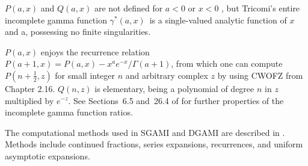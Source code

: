 \documentclass[twoside]{MATH77}
\begin{document}
%
$P(a,x)$ and $Q(a,x)$ are not defined for $a < 0$ or $x < 0$%
, but Tricomi's entire incomplete gamma function $\gamma ^*(a,x)$\ is a
single-valued analytic function of $x$ and a, possessing no finite
singularities.

$P(a,x)$ enjoys the recurrence relation $P(a+1,x) = P(a,x) -
x^ae^{-x}/\Gamma (a+1)$, from which one can compute $P(n+\frac 12,z)$ for
small integer $n$ and arbitrary complex $z$ by using CWOFZ from Chapter
2.16.  $Q(n,z)$ is elementary, being a polynomial of degree $n$ in $z$
multiplied by $e^{-z}$.  See Sections~6.5 and~26.4 of \cite{ams55:gamma}
for further properties of the incomplete gamma function ratios.

The computational methods used in SGAMI and DGAMI are described in
\cite{DiDonato:1986:CIG}.  Methods include continued fractions, series
expansions, recurrences, and uniform asymptotic expansions.
\end{document}
